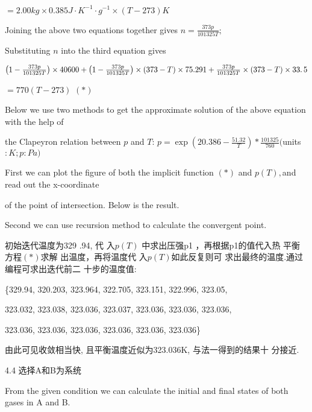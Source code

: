 \documentclass{article}
\begin{document}
$=2.00\unit{kg}\times 0.385\unit{J}\cdot \unit{K}^{-1}\cdot \unit{g}%
^{-1}\times \left( T-273\right) \unit{K}$

Joining the above two equations together gives $n=\frac{373p}{101325T};$

Substituting $n$ into the third equation gives

$\left( 1-\frac{373p}{101325T}\right) \times 40600+\left( 1-\frac{373p}{%
101325T}\right) \times \left( 373-T\right) \times 75.291+\frac{373p}{101325T}%
\times \left( 373-T\right) \times \allowbreak 33.\,\allowbreak 5$

$=770\left( T-273\right) $ $\left( \ast \right) $

Below we use two methods to get the approximate solution of the above
equation with the help of

the Clapeyron relation between $p$ and $T$: $p=\exp \left( 20.386-\frac{51.32%
}{T}\right) \ast \frac{101325}{760}($units$:\unit{K};p:\unit{Pa})$

First we can plot the figure of both the implicit function $\left( \ast
\right) $ and $p\left( T\right) ,$and read out the x-coordinate \ \qquad\ \ 

of the point of intersection. Below is the result.


Second we can use recursion method to calculate the convergent point.

初始迭代温度为329 .94, 代%
入$p\left( T\right) $ 中求出压强p1%
，再根据p1的值代入热%
平衡方程$\left( \ast \right) $求解%
出温度，再将温度代%
入$p\left( T\right) $如此反复则可%
求出最终的温度.通过%
编程可求出迭代前二%
十步的温度值:

\{329.94, 320.203, 323.964, 322.705, 323.151, 322.996, 323.05,

323.032, 323.038, 323.036, 323.037, 323.036, 323.036, 323.036,

323.036, 323.036, 323.036, 323.036, 323.036, 323.036\}

由此可见收敛相当快,%
且平衡温度近似为323.036K,%
与法一得到的结果十%
分接近.

4.4 选择A和B为系统

From the given condition we can calculate the initial and final states of
both gases in A and B.
\end{document}
